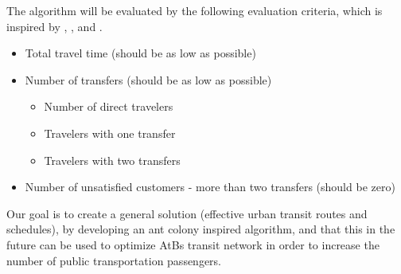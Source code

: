 The algorithm will be evaluated by the following evaluation criteria, which is inspired by \citep{kechagiopoulos14}, \citep{mandl80}, \citep{nikolic14} and \citep{fan09}.
\begin{itemize}
\item Total travel time (should be as low as possible)
\item Number of transfers (should be as low as possible)
\begin{itemize}
\item Number of direct travelers 
\item Travelers with one transfer
\item Travelers with two transfers
\end{itemize}
\item Number of unsatisfied customers - more than two transfers (should be zero)
\end{itemize}

Our goal is to create a general solution (effective urban transit routes and schedules), by developing an ant colony inspired algorithm, and that this in the future can be used to optimize AtBs transit network in order to increase the number of public transportation passengers. 
